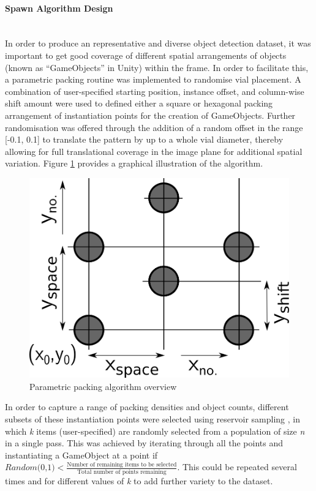 \documentclass[10pt]{article}
\newcommand{\subsubsubsection}[1]{\paragraph{#1}\mbox{}\\}
\begin{document}
\clearpage

\subsubsubsection{Spawn Algorithm Design}
In order to produce an representative and diverse object detection dataset, it was important to get good coverage of different spatial arrangements of objects (known as ``GameObjects'' in Unity) within the frame. In order to facilitate this, a parametric packing routine was implemented to randomise vial placement. A combination of user-specified starting position, instance offset, and column-wise shift amount were used to defined either a square or hexagonal packing arrangement of instantiation points for the creation of GameObjects. Further randomisation was offered through the addition of a random offset in the range [-0.1, 0.1] to translate the pattern by up to a whole vial diameter, thereby allowing for full translational coverage in the image plane for additional spatial variation. Figure \ref{fig:vial_placement_hex} provides a graphical illustration of the algorithm.

\vspace{0.15cm}
\begin{figure}[hbt]
\centering
\includegraphics[width=0.45\linewidth]{images/Spawn_Hex.png}
\caption{Parametric packing algorithm overview}
\label{fig:vial_placement_hex}
\end{figure}

In order to capture a range of packing densities and object counts, different subsets of these instantiation points were selected using reservoir sampling \cite{vitter1985random}, in which \textit{k} items (user-specified) are randomly selected from a population of size \textit{n} in a single pass. This was achieved by iterating through all the points and instantiating a GameObject at a point if $\textit{Random(0,1)} < \frac{\text{Number of remaining items to be selected}}{\text{Total number of points remaining}} $. This could be repeated several times and for different values of \textit{k} to add further variety to the dataset.
\end{document}
